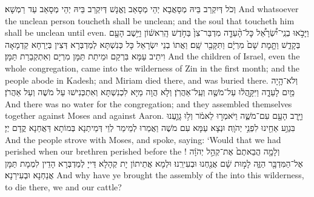 {וְכֹל דְּיִקְרַב בֵּיהּ מְסָאֲבָא יְהֵי מְסָאַב וֶאֱנָשׁ דְּיִקְרַב בֵּיהּ יְהֵי מְסָאַב עַד רַמְשָׁא׃}
{And whatsoever the unclean person toucheth shall be unclean; and the soul that toucheth him shall be unclean until even.}{}
\newperek
{}%
{וַיָּבֹ֣אוּ בְנֵֽי־יִ֠שְׂרָאֵ֠ל כׇּל־הָ֨עֵדָ֤ה מִדְבַּר־צִן֙ בַּחֹ֣דֶשׁ הָֽרִאשׁ֔וֹן וַיֵּ֥שֶׁב הָעָ֖ם בְּקָדֵ֑שׁ וַתָּ֤מׇת שָׁם֙ מִרְיָ֔ם וַתִּקָּבֵ֖ר שָֽׁם׃
}
{וַאֲתוֹ בְנֵי יִשְׂרָאֵל כָּל כְּנִשְׁתָּא לְמַדְבְּרָא דְּצִין בְּיַרְחָא קַדְמָאָה וִיתֵיב עַמָּא בִּרְקַם וּמֵיתַת תַּמָּן מִרְיָם וְאִתְקְבַרַת תַּמָּן׃}
{And the children of Israel, even the whole congregation, came into the wilderness of Zin in the first month; and the people abode in Kadesh; and Miriam died there, and was buried there.}{}
{וְלֹא־הָ֥יָה מַ֖יִם לָעֵדָ֑ה וַיִּקָּ֣הֲל֔וּ עַל־מֹשֶׁ֖ה וְעַֽל־אַהֲרֹֽן׃
}
{וְלָא הֲוָה מַיָּא לִכְנִשְׁתָּא וְאִתְכְּנִישׁוּ עַל מֹשֶׁה וְעַל אַהֲרֹן׃}
{And there was no water for the congregation; and they assembled themselves together against Moses and against Aaron.}{}
{וַיָּ֥רֶב הָעָ֖ם עִם־מֹשֶׁ֑ה וַיֹּאמְר֣וּ לֵאמֹ֔ר וְל֥וּ גָוַ֛עְנוּ בִּגְוַ֥ע אַחֵ֖ינוּ לִפְנֵ֥י יְהֹוָֽה׃
}
{וּנְצָא עַמָּא עִם מֹשֶׁה וַאֲמַרוּ לְמֵימַר לְוֵי דְּמֵיתְנָא בְּמוֹתָא דַּאֲחַנָא קֳדָם יְיָ׃}
{And the people strove with Moses, and spoke, saying: ‘Would that we had perished when our brethren perished before the \lord!}{}
{וְלָמָ֤ה הֲבֵאתֶם֙ אֶת־קְהַ֣ל יְהֹוָ֔ה אֶל־הַמִּדְבָּ֖ר הַזֶּ֑ה לָמ֣וּת שָׁ֔ם אֲנַ֖חְנוּ וּבְעִירֵֽנוּ׃}
{וּלְמָא אֲתֵיתוֹן יָת קְהָלָא דַּייָ לְמַדְבְּרָא הָדֵין לִמְמָת תַּמָּן אֲנַחְנָא וּבְעִירַנָא׃}
{And why have ye brought the assembly of the \lord\space into this wilderness, to die there, we and our cattle?}{}
